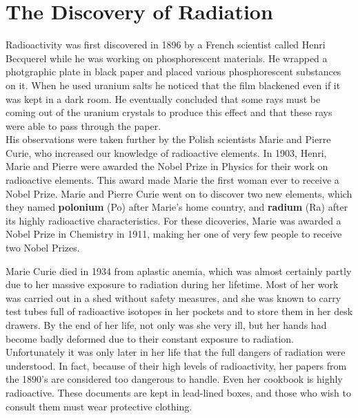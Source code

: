 



\section{The Discovery of Radiation}
\label{sec:an:td}

Radioactivity was first discovered in 1896 by a French scientist called Henri Becquerel while he was working on phosphorescent materials. He wrapped a photgraphic plate in black paper and placed various phosphorescent substances on it. When he used uranium salts he noticed that the film blackened even if it was kept in a dark room. He eventually concluded that some rays must be coming out of the uranium crystals to produce this effect and that these rays were able to pass through the paper. \\

His observations were taken further by the Polish scientists Marie and Pierre Curie, who increased our knowledge of radioactive elements. In 1903, Henri, Marie and Pierre were awarded the Nobel Prize in Physics for their work on radioactive elements. This award made Marie the first woman ever to receive a Nobel Prize. Marie and Pierre Curie went on to discover two new elements, which they named \textbf{polonium} (Po) after Marie's home country, and \textbf{radium} (Ra) after its highly radioactive characteristics. For these dicoveries, Marie was awarded a Nobel Prize in Chemistry in 1911, making her one of very few people to receive two Nobel Prizes. \\

\begin{IFact}
{Marie Curie died in 1934 from aplastic anemia, which was almost certainly partly due to her massive exposure to radiation during her lifetime. Most of her work was carried out in a shed without safety measures, and she was known to carry test tubes full of radioactive isotopes in her pockets and to store them in her desk drawers. By the end of her life, not only was she very ill, but her hands had become badly deformed due to their constant exposure to radiation. Unfortunately it was only later in her life that the full dangers of radiation were understood. In fact, because of their high levels of radioactivity, her papers from the 1890's are considered too dangerous to handle. Even her cookbook is highly radioactive. These documents are kept in lead-lined boxes, and those who wish to consult them must wear protective clothing. }
\end{IFact}



